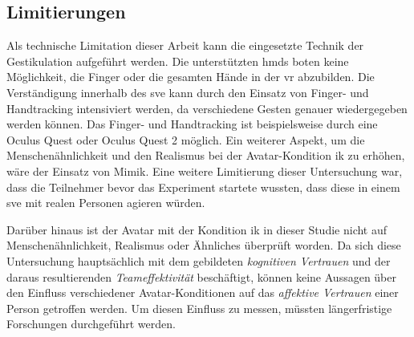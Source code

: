 \documentclass[a4paper,11pt]{article}%
\renewcommand{\\}{\vspace*{0.5\baselineskip} \newline}
\begin{document}
{{%
%			



\subsection{Limitierungen}
Als technische Limitation dieser Arbeit kann die eingesetzte Technik der Gestikulation aufgeführt werden. Die unterstützten \ac{hmd}s boten keine Möglichkeit, die Finger oder die gesamten Hände in der \ac{vr} abzubilden. Die Verständigung innerhalb des \ac{sve} kann durch den Einsatz von Finger- und Handtracking intensiviert werden, da verschiedene Gesten genauer wiedergegeben werden können. Das Finger- und Handtracking ist beispielsweise durch eine Oculus Quest oder Oculus Quest 2 möglich. Ein weiterer Aspekt, um die Menschenähnlichkeit und den Realismus bei der Avatar-Kondition \ac{ik} zu erhöhen, wäre der Einsatz von Mimik.
Eine weitere Limitierung dieser Untersuchung war, dass die Teilnehmer bevor das Experiment startete wussten, dass diese in einem \ac{sve} mit realen Personen agieren würden. 

Darüber hinaus ist der Avatar mit der Kondition \ac{ik} in dieser Studie nicht auf Menschenähnlichkeit, Realismus oder Ähnliches überprüft worden. 
Da sich diese Untersuchung hauptsächlich mit dem gebildeten \textit{kognitiven Vertrauen} und der daraus resultierenden \textit{Teameffektivität} beschäftigt, können keine Aussagen über den Einfluss verschiedener Avatar-Konditionen auf das \textit{affektive Vertrauen} einer Person getroffen werden. Um diesen Einfluss zu messen, müssten längerfristige Forschungen durchgeführt werden.


%

}}
\end{document}
